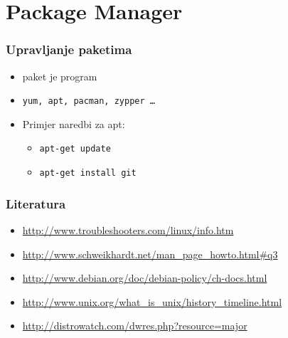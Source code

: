 \documentclass{beamer}
\begin{document}
\section{Package Manager}
\begin{frame}[t]
\frametitle{Upravljanje paketima}
\begin{itemize}
  \item paket je program
  \item \texttt{yum, apt, pacman, zypper \ldots}
  \item Primjer naredbi za apt:
  \begin{itemize}
  	\item  \texttt{apt-get update}
	\item \texttt{apt-get install git}
  \end{itemize}
\end{itemize}
\end{frame}

\begin{frame}[t]
\frametitle{Literatura}
\begin{itemize}
  \item \url{http://www.troubleshooters.com/linux/info.htm}
  \item \url{http://www.schweikhardt.net/man_page_howto.html\#q3}
  \item \url{http://www.debian.org/doc/debian-policy/ch-docs.html}
  \item \url{http://www.unix.org/what_is_unix/history_timeline.html}
  \item \url{http://distrowatch.com/dwres.php?resource=major}
\end{itemize}
\end{frame}
\end{document}
